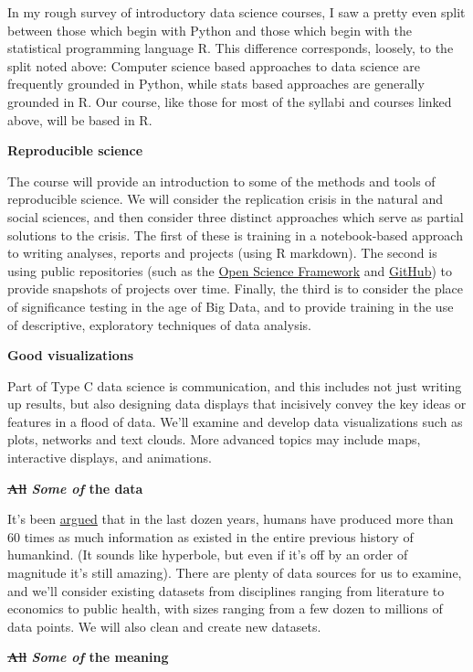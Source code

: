 \documentclass[]{book}
\theoremstyle{definition}
\theoremstyle{definition}
\theoremstyle{definition}
\theoremstyle{remark}
\begin{document}
In my rough survey of introductory data science courses, I saw a pretty
even split between those which begin with Python and those which begin
with the statistical programming language R. This difference
corresponds, loosely, to the split noted above: Computer science based
approaches to data science are frequently grounded in Python, while
stats based approaches are generally grounded in R. Our course, like
those for most of the syllabi and courses linked above, will be based in
R.

\textbf{Reproducible science}

The course will provide an introduction to some of the methods and tools
of reproducible science. We will consider the replication crisis in the
natural and social sciences, and then consider three distinct approaches
which serve as partial solutions to the crisis. The first of these is
training in a notebook-based approach to writing analyses, reports and
projects (using R markdown). The second is using public repositories
(such as the \href{https://osf.io/}{Open Science Framework} and
\href{https://github.com/}{GitHub}) to provide snapshots of projects
over time. Finally, the third is to consider the place of significance
testing in the age of Big Data, and to provide training in the use of
descriptive, exploratory techniques of data analysis.

\textbf{Good visualizations}

Part of Type C data science is communication, and this includes not just
writing up results, but also designing data displays that incisively
convey the key ideas or features in a flood of data. We'll examine and
develop data visualizations such as plots, networks and text clouds.
More advanced topics may include maps, interactive displays, and
animations.

\textbf{\sout{All} \emph{Some of} the data}

It's been
\href{https://www.udemy.com/datascience/learn/v4/t/lecture/3473822?start=379}{argued}
that in the last dozen years, humans have produced more than 60 times as
much information as existed in the entire previous history of humankind.
(It sounds like hyperbole, but even if it's off by an order of magnitude
it's still amazing). There are plenty of data sources for us to examine,
and we'll consider existing datasets from disciplines ranging from
literature to economics to public health, with sizes ranging from a few
dozen to millions of data points. We will also clean and create new
datasets.

\textbf{\sout{All} \emph{Some of} the meaning}
\end{document}
